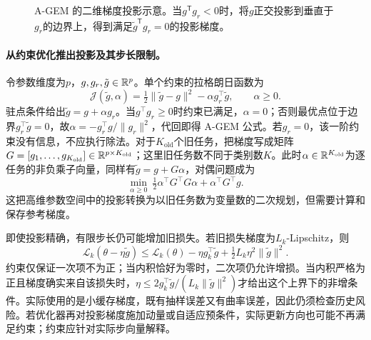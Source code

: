 \begin{figure}[htbp]
\centering
{}
\caption{A-GEM 的二维梯度投影示意。当$g^{\mathsf T}g_r<0$时，将$g$正交投影到垂直于$g_r$的边界上，得到满足$\tilde g^{\mathsf T}g_r=0$的投影梯度。}
\label{fig:agem-projection}
\end{figure}

\paragraph{从约束优化推出投影及其步长限制。}
令参数维度为$p$，$g,g_r,\tilde g\in\mathbb{R}^p$。单个约束的拉格朗日函数为
\begin{equation}
 \mathcal J(\tilde g,\alpha)=\tfrac12\|\tilde g-g\|^2-\alpha g_r^\top\tilde g,
 \qquad\alpha\geq0.
\end{equation}
驻点条件给出$\tilde g=g+\alpha g_r$。当$g^\top g_r\geq0$时约束已满足，$\alpha=0$；否则最优点位于边界$g_r^\top\tilde g=0$，故$\alpha=-g_r^\top g/\|g_r\|^2$，代回即得 A-GEM 公式。若$g_r=0$，该一阶约束没有信息，不应执行除法。对于$K_{\mathrm{old}}$个旧任务，把梯度写成矩阵$G=[g_1,\ldots,g_{K_{\mathrm{old}}}]\in\mathbb{R}^{p\times K_{\mathrm{old}}}$；这里旧任务数不同于类别数$K$。此时$\alpha\in\mathbb{R}^{K_{\mathrm{old}}}$为逐任务的非负乘子向量，同样有$\tilde g=g+G\alpha$，对偶问题成为
\begin{equation}
 \min_{\alpha\geq0}\ \tfrac12\alpha^\top G^\top G\alpha+\alpha^\top G^\top g.
\end{equation}
这把高维参数空间中的投影转换为以旧任务数为变量数的二次规划，但需要计算和保存参考梯度。

即使投影精确，有限步长仍可能增加旧损失。若旧损失梯度为$L_k$-Lipschitz，则
\begin{equation}
 \mathcal L_k(\theta-\eta\tilde g)
 \leq\mathcal L_k(\theta)-\eta g_k^\top\tilde g
 +\tfrac12L_k\eta^2\|\tilde g\|^2.
\end{equation}
约束仅保证一次项不为正；当内积恰好为零时，二次项仍允许增损。当内积严格为正且梯度确实来自该损失时，$\eta\leq2g_k^\top\tilde g/(L_k\|\tilde g\|^2)$才给出这个上界下的非增条件。实际使用的是小缓存梯度，既有抽样误差又有曲率误差，因此仍须检查历史风险。若优化器再对投影梯度施加动量或自适应预条件，实际更新方向也可能不再满足约束；约束应针对实际步向量解释。

